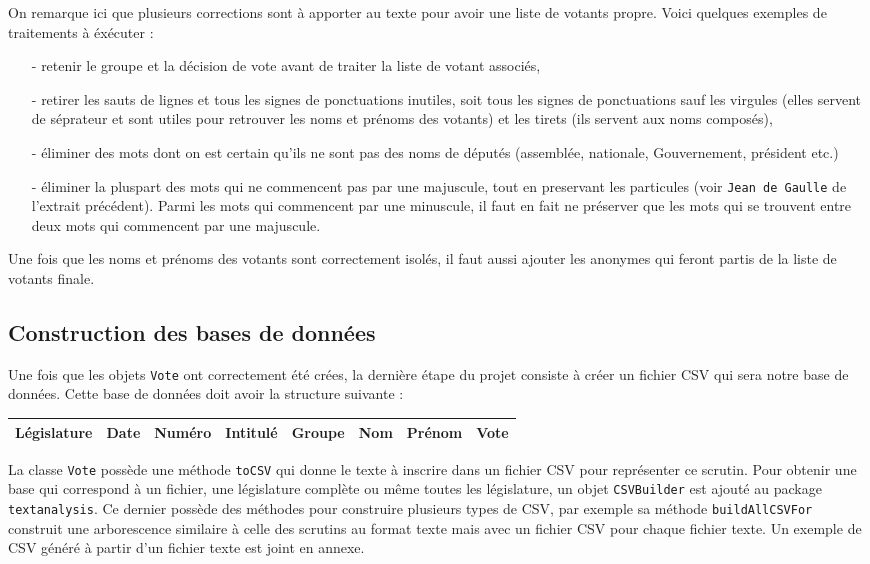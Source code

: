 On remarque ici que plusieurs corrections sont à apporter au texte pour avoir une liste de votants propre. Voici quelques exemples de traitements à éxécuter :
\begin{itemize}
\item[-] retenir le groupe et la décision de vote avant de traiter la liste de votant associés,
\item[-] retirer les sauts de lignes et tous les signes de ponctuations inutiles, soit tous les signes de ponctuations sauf les virgules (elles servent de séprateur et sont utiles pour retrouver les noms et prénoms des votants) et les tirets (ils servent aux noms composés),
\item[-] éliminer des mots dont on est certain qu'ils ne sont pas des noms de députés (assemblée, nationale, Gouvernement, président etc.)
\item[-] éliminer la pluspart des mots qui ne commencent pas par une majuscule, tout en preservant les particules (voir \verb|Jean de Gaulle| de l'extrait précédent). Parmi les mots qui commencent par une minuscule, il faut en fait ne préserver que les mots qui se trouvent entre deux mots qui commencent par une majuscule.
\end{itemize}

\vspace{0.3cm}
Une fois que les noms et prénoms des votants sont correctement isolés, il faut aussi ajouter les anonymes qui feront partis de la liste de votants finale.

\subsection{Construction des bases de données}

Une fois que les objets \verb|Vote| ont correctement été crées, la dernière étape du projet consiste à créer un fichier CSV qui sera notre base de données. Cette base de données doit avoir la structure suivante :

\begin{center}
\begin{tabular}{|c|c|c|c|c|c|c|c|}
\hline
Législature & Date & Numéro & Intitulé & Groupe & Nom & Prénom & Vote \\
\hline
\end{tabular}
\end{center}

La classe \verb|Vote| possède une méthode \verb|toCSV| qui donne le texte à inscrire dans un fichier CSV pour représenter ce scrutin. Pour obtenir une base qui correspond à un fichier, une législature complète ou même toutes les législature, un objet \verb|CSVBuilder| est ajouté au package \verb|textanalysis|. Ce dernier possède des méthodes pour construire plusieurs types de CSV, par exemple sa méthode \verb|buildAllCSVFor| construit une arborescence similaire à celle des scrutins au format texte mais avec un fichier CSV pour chaque fichier texte.\newline
Un exemple de CSV généré à partir d'un fichier texte est joint en annexe.
